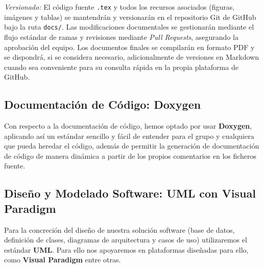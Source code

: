 \noindent\textit{Versionado:} El código fuente \texttt{.tex} y todos los recursos asociados (figuras, imágenes y tablas) se mantendrán y versionarán en el repositorio Git de GitHub bajo la ruta \texttt{docs/}. Las modificaciones documentales se gestionarán mediante el flujo estándar de ramas y revisiones mediante \textit{Pull Requests}, asegurando la aprobación del equipo. Los documentos finales se compilarán en formato PDF y se dispondrá, si se considera necesario, adicionalmente de versiones en Markdown cuando sea conveniente para su consulta rápida en la propia plataforma de GitHub.

\subsection{Documentación de Código: Doxygen}
Con respecto a la documentación de código, hemos optado por usar \textbf{Doxygen}, aplicando así un estándar sencillo y fácil de entender para el grupo y cualquiera que pueda heredar el código, además de permitir la generación de documentación de código de manera dinámica a partir de los propios comentarios en los ficheros fuente.

\subsection{Diseño y Modelado Software: UML con Visual Paradigm}
Para la concreción del diseño de nuestra solución software (base de datos, definición de clases, diagramas de arquitectura y casos de uso) utilizaremos el estándar \textbf{UML}. Para ello nos apoyaremos en plataformas diseñadas para ello, como \textbf{Visual Paradigm} entre otras.
